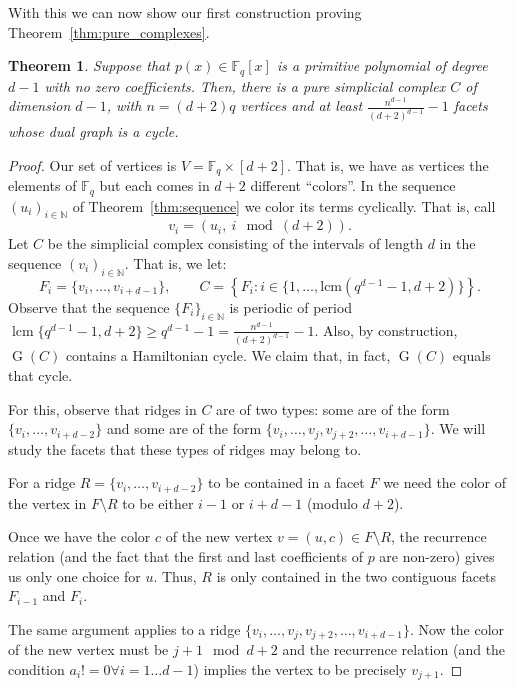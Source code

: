 \documentclass[12pt,a4paper]{article}
\newcommand{\graph}{\operatorname{G}}
\newcommand{\lcm}{\operatorname{lcm}}
\newcommand{\F}{\mathbb F}
\newcommand{\N}{\mathbb N}
\theoremstyle{plain}
\newtheorem{theorem}{Theorem}
\theoremstyle{definition}
\begin{document}
With this we can now show our first construction proving Theorem~\ref{thm:pure_complexes}.

\begin{theorem}
\label{thm:lfsr}
Suppose that $p(x)\in \F_q[x]$ is a primitive polynomial of degree $d-1$ with no zero coefficients. Then, there is a pure simplicial complex $C$ of dimension $d-1$, with $n=(d+2)q$ vertices and at least $\frac{n^{d-1}}{(d+2)^{d-1}}-1$ facets whose dual graph is a cycle.
\end{theorem}

\begin{proof}
Our set of vertices is $V=\F_q \times [d+2]$. That is, we have as vertices the elements of $\F_q$ but each comes in $d+2$ different ``colors''. In the sequence $(u_i)_{i\in \N}$ of Theorem~\ref{thm:sequence} we color its terms cyclically. That is, call
\[
v_i=(u_i,\ i \mod(d+2)).
\]
Let $C$ be the simplicial complex consisting of the intervals of length $d$ in the sequence $(v_i)_{i\in \N}$. That is, we let:
\[
F_i= \{v_i,\dots,v_{i+d-1}\}, \qquad
C= \left\{F_i : i\in \{1,\dots, \text{lcm}(q^{d-1}-1, d+2)\} \right\}.
\]
Observe that the sequence $\{F_i\}_{i\in \N}$ is periodic of period $\lcm\{q^{d-1}-1, d+2\} \ge q^{d-1}-1=\frac{n^{d-1}}{(d+2)^{d-1}}-1$. Also, by construction, $\graph(C)$ contains a Hamiltonian cycle. We claim that, in fact, $\graph(C)$ equals that cycle. 

For this, observe that ridges in  $C$ are of two types: some are of the form $\{v_i,\dots,v_{i+d-2}\}$ and some are of the form $\{v_i,\dots,v_j,v_{j+2},\dots,v_{i+d-1}\}$. We will study the facets that these types of ridges may belong to.

For a ridge $R=\{v_i,\dots,v_{i+d-2}\}$ to be contained in a facet $F$ we need the color of the vertex in $F\setminus R$ to be either $i-1$ or $i+d-1$ (modulo $d+2$).

Once we have  the color $c$ of the new vertex $v=(u,c)\in F\setminus R$, the recurrence relation (and the fact that the first and last coefficients of $p$ are non-zero) gives us only one choice for $u$. Thus, $R$ is only contained in the two contiguous facets $F_{i-1}$ and $F_i$.

The same argument applies to a ridge $\{v_i,\dots,v_j,v_{j+2},\dots,v_{i+d-1}\}$. Now the color of the new vertex must be $j+1\mod d+2$ and the recurrence relation (and the condition $a_i!=0 \forall i=1\dots d-1$) implies the vertex to be precisely $v_{j+1}$.
\end{proof}
\end{document}
